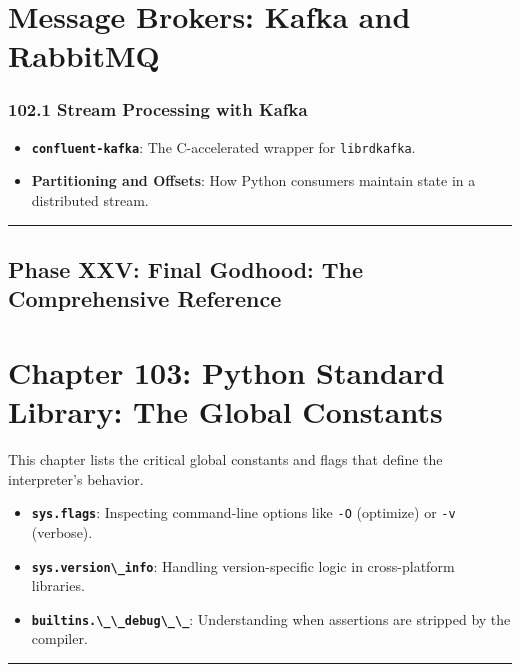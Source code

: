 \hypertarget{message-brokers-kafka-and-rabbitmq}{%
\chapter{Message Brokers: Kafka and
RabbitMQ}\label{message-brokers-kafka-and-rabbitmq}}

\hypertarget{stream-processing-with-kafka}{%
\subsection{102.1 Stream Processing with
Kafka}\label{stream-processing-with-kafka}}

\begin{itemize}
\tightlist
\item
  \textbf{\passthrough{\lstinline!confluent-kafka!}}: The C-accelerated
  wrapper for \passthrough{\lstinline!librdkafka!}.
\item
  \textbf{Partitioning and Offsets}: How Python consumers maintain state
  in a distributed stream.
\end{itemize}

\begin{center}\rule{0.5\linewidth}{0.5pt}\end{center}

\hypertarget{phase-xxv-final-godhood-the-comprehensive-reference}{%
\section{Phase XXV: Final Godhood: The Comprehensive
Reference}\label{phase-xxv-final-godhood-the-comprehensive-reference}}

\hypertarget{chapter-103-python-standard-library-the-global-constants}{%
\chapter{Chapter 103: Python Standard Library: The Global
Constants}\label{chapter-103-python-standard-library-the-global-constants}}

This chapter lists the critical global constants and flags that define
the interpreter's behavior.

\begin{itemize}
\tightlist
\item
  \textbf{\passthrough{\lstinline!sys.flags!}}: Inspecting command-line
  options like \passthrough{\lstinline!-O!} (optimize) or
  \passthrough{\lstinline!-v!} (verbose).
\item
  \textbf{\passthrough{\lstinline!sys.version\_info!}}: Handling
  version-specific logic in cross-platform libraries.
\item
  \textbf{\passthrough{\lstinline!builtins.\_\_debug\_\_!}}:
  Understanding when assertions are stripped by the compiler.
\end{itemize}

\begin{center}\rule{0.5\linewidth}{0.5pt}\end{center}
